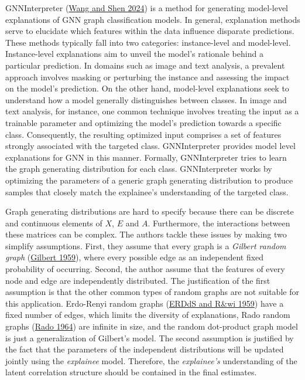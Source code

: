 \documentclass[
  11pt,
  letterpaper,
]{article}
\begin{document}
\quad GNNInterpreter (\protect\hyperlink{ref-Wang_Shen_2024}{Wang and
Shen 2024}) is a method for generating model-level explanations of GNN
graph classification models. In general, explanation methods serve to
elucidate which features within the data influence disparate
predictions. These methods typically fall into two categories:
instance-level and model-level. Instance-level explanations aim to
unveil the model's rationale behind a particular prediction. In domains
such as image and text analysis, a prevalent approach involves masking
or perturbing the instance and assessing the impact on the model's
prediction. On the other hand, model-level explanations seek to
understand how a model generally distinguishes between classes. In image
and text analysis, for instance, one common technique involves treating
the input as a trainable parameter and optimizing the model's prediction
towards a specific class. Consequently, the resulting optimized input
comprises a set of features strongly associated with the targeted class.
GNNInterpreter provides model level explanations for GNN in this manner.
Formally, GNNInterpreter tries to learn the graph generating
distribution for each class. GNNInterpreter works by optimizing the
parameters of a generic graph generating distribution to produce samples
that closely match the explainee's understanding of the targeted class.

\quad Graph generating distributions are hard to specify because there
can be discrete and continuous elements of \(X\), \(E\) and \(A\).
Furthermore, the interactions between these matrices can be complex. The
authors tackle these issues by making two simplify assumptions. First,
they assume that every graph is a \emph{Gilbert random graph}
(\protect\hyperlink{ref-Gilbert_1959}{Gilbert 1959}), where every
possible edge as an independent fixed probability of occurring. Second,
the author assume that the features of every node and edge are
independently distributed. The justification of the first assumption is
that the other common types of random graphs are not suitable for this
application. Erdo-Renyi random graphs
(\protect\hyperlink{ref-erdds1959random}{ERDdS and R\&wi 1959}) have a
fixed number of edges, which limits the diversity of explanations, Rado
random graphs (\protect\hyperlink{ref-Rado1964UniversalGA}{Rado 1964})
are infinite in size, and the random dot-product graph model is just a
generalization of Gilbert's model. The second assumption is justified by
the fact that the parameters of the independent distributions will be
updated jointly using the \emph{explainee} model. Therefore, the
\emph{explainee's} understanding of the latent correlation structure
should be contained in the final estimates.
\end{document}

